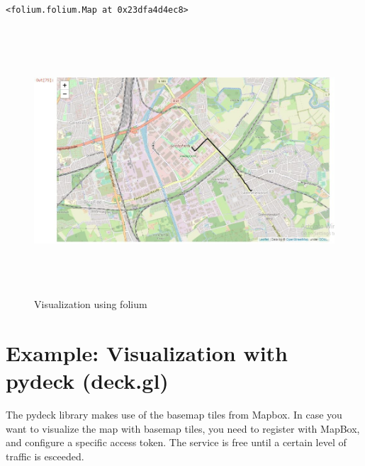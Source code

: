 \documentclass[11pt]{article}
\makeatletter
\newcommand{\boxspacing}{\kern\kvtcb@left@rule\kern\kvtcb@boxsep}
\newcommand{\prompt}[4]{
        \ttfamily\llap{{\color{#2}[#3]:\hspace{3pt}#4}}\vspace{-\baselineskip}
    }
\makeatother
\begin{document}
\begin{tcolorbox}[breakable, size=fbox, boxrule=.5pt, pad at break*=1mm, opacityfill=0]
\prompt{Out}{outcolor}{75}{\boxspacing}
\begin{Verbatim}[commandchars=\\\{\}]
<folium.folium.Map at 0x23dfa4d4ec8>
\end{Verbatim}
\end{tcolorbox}

\begin{tcolorbox}[breakable, size=fbox, boxrule=.5pt, pad at break*=1mm, opacityfill=0]
	\prompt{Out}{outcolor}{75}{\boxspacing}
	\begin{figure}[H]
		\centering
		\includegraphics[width=1\linewidth,height=10cm]{folium.jpg} 
		\caption{Visualization using folium}
		\label{fig:workflow}
	\end{figure}
\end{tcolorbox}
        
    \hypertarget{example-visualization-with-pydeck-deck.gl}{%
\section{Example: Visualization with pydeck
(deck.gl)}\label{example-visualization-with-pydeck-deck.gl}}

    The pydeck library makes use of the basemap tiles from Mapbox. In case
you want to visualize the map with basemap tiles, you need to register
with MapBox, and configure a specific access token. The service is free
until a certain level of traffic is esceeded.
\end{document}
